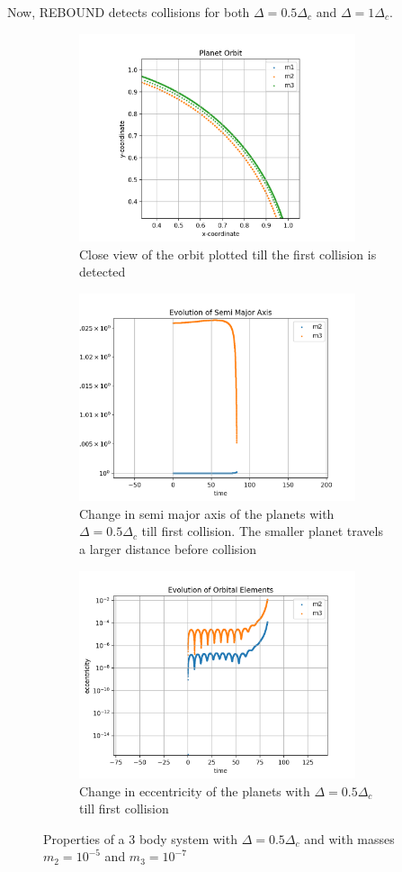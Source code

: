 \documentclass[12pt,a4paper]{article}
\begin{document}
Now, REBOUND detects collisions for both $\Delta=0.5\Delta_c$ and $\Delta=1\Delta_c$.\\
\begin{figure}[H]
  \centering
  \begin{subfigure}{0.4\textwidth}
    \centering
    \includegraphics[height = 2.4in]{3Body/3BD_orbit_delta_2_0.5_collide.png}
    \caption{Close view of the orbit plotted till the first collision is detected}
  \end{subfigure}
  \begin{subfigure}{0.4\textwidth}
    \centering
    \includegraphics[height = 2.4in]{3Body/3BD_a_delta_2_0.5_collide.png}
    \caption{Change in semi major axis of the planets with $\Delta = 0.5\Delta_c$ till first collision. The smaller planet travels a larger distance before collision}
  \end{subfigure}

  \begin{subfigure}{0.4\textwidth}
    \centering
    \includegraphics[height = 2.4in]{3Body/3BD_ecc_delta_2_0.5_collide.png}
    \caption{Change in eccentricity of the planets with $\Delta = 0.5\Delta_c$ till first collision}
  \end{subfigure}
  \caption{Properties of a 3 body system with $\Delta = 0.5\Delta_c$ and with masses $m_2=10^{-5}$ and $m_3=10^{-7}$}
\end{figure}
\end{document}
